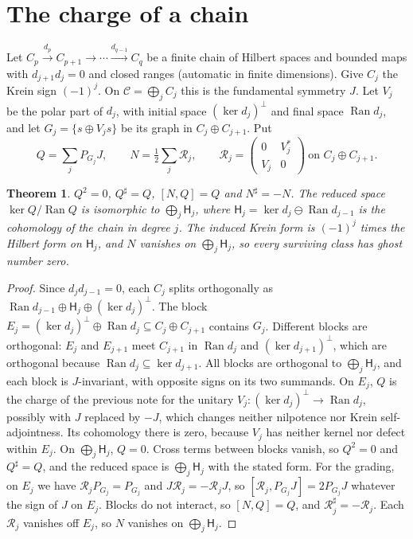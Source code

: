 \documentclass[11pt]{article}
\newtheorem{theorem}{Theorem}
\theoremstyle{remark}
\newcommand{\Ran}{\operatorname{Ran}}
\begin{document}
\section{The charge of a chain}

Let $C_p\xrightarrow{d_p}C_{p+1}\to\cdots\xrightarrow{d_{q-1}}C_q$ be a finite chain of Hilbert spaces and bounded maps with $d_{j+1}d_j=0$ and closed ranges (automatic in finite dimensions). Give $C_j$ the Krein sign $(-1)^j$. On $\mathcal C=\bigoplus_jC_j$ this is the fundamental symmetry $J$. Let $V_j$ be the polar part of $d_j$, with initial space $(\ker d_j)^\perp$ and final space $\Ran d_j$, and let $G_j=\{s\oplus V_js\}$ be its graph in $C_j\oplus C_{j+1}$. Put
\[
 Q=\sum_jP_{G_j}J,\qquad N=\tfrac12\sum_j\mathcal R_j,\qquad
 \mathcal R_j=\begin{pmatrix}0&V_j^*\\ V_j&0\end{pmatrix}\ \text{on }C_j\oplus C_{j+1}.
\]

\begin{theorem}\label{thm:chain}
$Q^2=0$, $Q^\sharp=Q$, $[N,Q]=Q$ and $N^\sharp=-N$. The reduced space $\ker Q/\Ran Q$ is isomorphic to $\bigoplus_j\mathsf H_j$, where $\mathsf H_j=\ker d_j\ominus\Ran d_{j-1}$ is the cohomology of the chain in degree $j$. The induced Krein form is $(-1)^j$ times the Hilbert form on $\mathsf H_j$, and $N$ vanishes on $\bigoplus_j\mathsf H_j$, so every surviving class has ghost number zero.
\end{theorem}

\begin{proof}
Since $d_jd_{j-1}=0$, each $C_j$ splits orthogonally as $\Ran d_{j-1}\oplus\mathsf H_j\oplus(\ker d_j)^\perp$. The block $E_j=(\ker d_j)^\perp\oplus\Ran d_j\subseteq C_j\oplus C_{j+1}$ contains $G_j$. Different blocks are orthogonal: $E_j$ and $E_{j+1}$ meet $C_{j+1}$ in $\Ran d_j$ and $(\ker d_{j+1})^\perp$, which are orthogonal because $\Ran d_j\subseteq\ker d_{j+1}$. All blocks are orthogonal to $\bigoplus_j\mathsf H_j$, and each block is $J$-invariant, with opposite signs on its two summands. On $E_j$, $Q$ is the charge of the previous note for the unitary $V_j:(\ker d_j)^\perp\to\Ran d_j$, possibly with $J$ replaced by $-J$, which changes neither nilpotence nor Krein self-adjointness. Its cohomology there is zero, because $V_j$ has neither kernel nor defect within $E_j$. On $\bigoplus_j\mathsf H_j$, $Q=0$. Cross terms between blocks vanish, so $Q^2=0$ and $Q^\sharp=Q$, and the reduced space is $\bigoplus_j\mathsf H_j$ with the stated form. For the grading, on $E_j$ we have $\mathcal R_jP_{G_j}=P_{G_j}$ and $J\mathcal R_j=-\mathcal R_jJ$, so $[\mathcal R_j,P_{G_j}J]=2P_{G_j}J$ whatever the sign of $J$ on $E_j$. Blocks do not interact, so $[N,Q]=Q$, and $\mathcal R_j^\sharp=-\mathcal R_j$. Each $\mathcal R_j$ vanishes off $E_j$, so $N$ vanishes on $\bigoplus_j\mathsf H_j$.
\end{proof}
\end{document}
